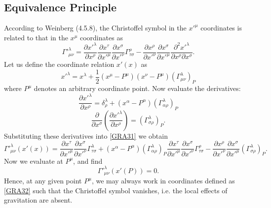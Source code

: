 \documentclass[10pt,letterpaper]{article}
\numberwithin{equation}{subsection}
\begin{document}
\subsection{Equivalence Principle}
According to Weinberg (4.5.8), the Christoffel symbol in the $x'^\mu$ coordinates is related to that in the $x^\mu$ coordinates as
\begin{equation}
\Gamma'^\lambda_{\mu\nu} = \frac{\partial x'^\lambda}{\partial x^\rho}\frac{\partial x^\tau }{\partial x'^\mu }\frac{\partial x^\sigma }{\partial x'^\nu}\Gamma^{\rho}_{\tau\sigma}
-\frac{\partial x^\rho}{\partial x'^\nu}\frac{\partial x^\sigma }{\partial x'^\mu}\frac{\partial^2 x'^\lambda }{\partial x^\rho \partial x^\sigma}\label{GRA31}.
\end{equation}
Let us define the coordinate relation $x'(x)$ as
\begin{equation}
x'^\lambda = x^\lambda + \frac12(x^\mu-P^\mu)( x^\nu-P^\mu) \left(\Gamma^\lambda_{\mu\nu}\right)_P\label{GRA32}
\end{equation}
where $P^\mu$ denotes an arbitrary coordinate point. 
Now evaluate the derivatives:
\begin{equation}
\frac{\partial x'^\lambda}{\partial x^\rho} = \delta^\lambda_\rho + (x^\alpha-P^\alpha) \left(\Gamma^\lambda_{\alpha\rho}\right)_P
\end{equation}
\begin{equation}
\frac{\partial}{\partial x^\sigma}\left(\frac{\partial x'^\lambda}{\partial x^\rho} \right)= \left(\Gamma^\lambda_{\sigma\rho}\right)_P.
\end{equation}
Substituting these derivatives into \ref{GRA31} we obtain
\begin{equation} 
\Gamma'^\lambda_{\mu\nu}(x'(x))  = \frac{\partial x^\tau }{\partial x'^\mu }\frac{\partial x^\sigma }{\partial x'^\nu}\Gamma^{\lambda}_{\tau\sigma}
+   (x^\alpha-P^\alpha) \left(\Gamma^\lambda_{\alpha\rho}\right)_P\frac{\partial x^\tau }{\partial x'^\mu }\frac{\partial x^\sigma }{\partial x'^\nu}\Gamma^{\rho}_{\tau\sigma}
-\frac{\partial x^\rho}{\partial x'^\nu}\frac{\partial x^\sigma }{\partial x'^\mu} \left(\Gamma^\lambda_{\sigma\rho}\right)_P.
\end{equation}
Now we evaluate at $P^\mu$, and find 
\begin{equation}
	\Gamma'^\lambda_{\mu\nu}(x'(P)) = 0.
\end{equation}
Hence, at any given point $P^\mu$, we may always work in coordinates defined as \ref{GRA32} such that the Christoffel symbol vanishes, i.e. the local effects of gravitation are absent. 
\end{document}
